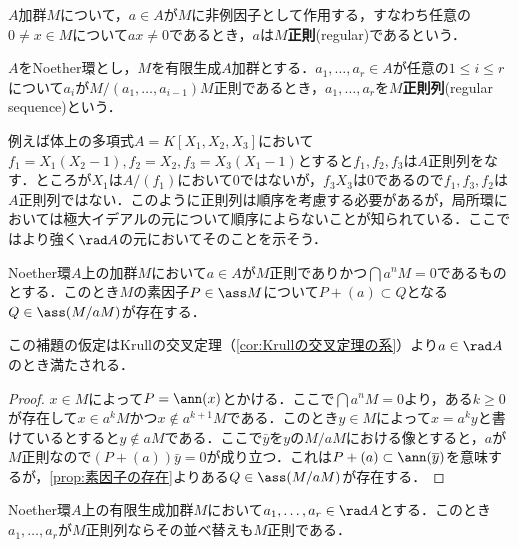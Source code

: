 \begin{defi}[正則元]
	$A$加群$M$について，$a\in A$が$M$に非例因子として作用する，すなわち任意の$0\neq x\in M$について$ax\neq0$であるとき，$a$は$M$\textbf{正則}(regular)であるという．
\end{defi}

\begin{defi}[正則列]
	$A$をNoether環とし，$M$を有限生成$A$加群とする．$a_1,\dots,a_r\in A$が任意の$1\leq i\leq r$について$a_i$が$M/(a_1,\dots,a_{i-1})M$正則であるとき，$a_1,\dots,a_r$を$M$\textbf{正則列}(regular sequence)という．
\end{defi}

例えば体上の多項式$A=K[X_1,X_2,X_3]$において$f_1=X_1(X_2-1),f_2=X_2,f_3=X_3(X_1-1)$とすると$f_1,f_2,f_3$は$A$正則列をなす．ところが$X_1$は$A/(f_1)$において$0$ではないが，$f_3X_3$は$0$であるので$f_1,f_3,f_2$は$A$正則列ではない．このように正則列は順序を考慮する必要があるが，局所環においては極大イデアルの元について順序によらないことが知られている．ここではより強く$\rad A$の元においてそのことを示そう．

\begin{lem}\label{lem:正則元と素因子}
	Noether環$A$上の加群$M$において$a\in A$が$M$正則でありかつ$\bigcap a^nM=0$であるものとする．このとき$M$の素因子$P\in\ass M$について$P+(a)\subset Q$となる$Q\in\ass (M/aM)$が存在する．
\end{lem}

この補題の仮定はKrullの交叉定理（\ref{cor:Krullの交叉定理の系}）より$a\in\rad A$のとき満たされる．

\begin{proof}
	$x\in M$によって$P=\ann (x)$とかける．ここで$\bigcap a^nM=0$より，ある$k\geq0$が存在して$x\in a^kM$かつ$x\not\in a^{k+1}M$である．このとき$y\in M$によって$x=a^ky$と書けているとすると$y\not\in aM$である．ここで$\bar{y}$を$y$の$M/aM$における像とすると，$a$が$M$正則なので$(P+(a))\bar{y}=0$が成り立つ．これは$P+(a)\subset\ann (\bar{y})$を意味するが，\ref{prop:素因子の存在}よりある$Q\in\ass (M/aM)$が存在する．
\end{proof}

\begin{prop}
	Noether環$A$上の有限生成加群$M$において$a_1,\dots,a_r\in\rad A$とする．このとき$a_1,\dots,a_r$が$M$正則列ならその並べ替えも$M$正則である．
\end{prop}

